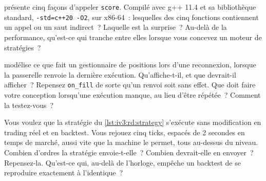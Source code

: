 \begin{question}\label{iq:iv3:reading-debugging-and-software-design:34}
 présente cinq façons d'appeler \texttt{score}. Compilé avec g++ 11.4 et sa bibliothèque standard, \texttt{-std=c++20 -O2}, sur x86-64~: lesquelles des cinq fonctions contiennent un appel ou un saut indirect~? Laquelle est la surprise~? Au-delà de la performance, qu'est-ce qui tranche entre elles lorsque vous concevez un moteur de stratégies~?
\label{lst:iv3:rd:dispatch}
\end{question}

\begin{question}\label{iq:iv3:reading-debugging-and-software-design:35}
 modélise ce que fait un gestionnaire de positions lors d'une reconnexion, lorsque la passerelle renvoie la dernière exécution. Qu'affiche-t-il, et que devrait-il afficher~? Repensez \texttt{on\_fill} de sorte qu'un renvoi soit sans effet. Que doit faire votre conception lorsqu'une exécution manque, au lieu d'être répétée~? Comment la testez-vous~?
\label{lst:iv3:rd:replay}
\end{question}

\begin{question}\label{iq:iv3:reading-debugging-and-software-design:36}
Vous voulez que la stratégie du \cref{lst:iv3:rd:strategy} s'exécute sans modification en trading réel et en backtest. Vous rejouez cinq ticks, espacés de 2 secondes en temps de marché, aussi vite que la machine le permet, tous au-dessus du niveau. Combien d'ordres la stratégie envoie-t-elle~? Combien devrait-elle en envoyer~? Repensez-la. Qu'est-ce qui, au-delà de l'horloge, empêche un backtest de se reproduire exactement à l'identique~?
\label{lst:iv3:rd:strategy}
\end{question}

